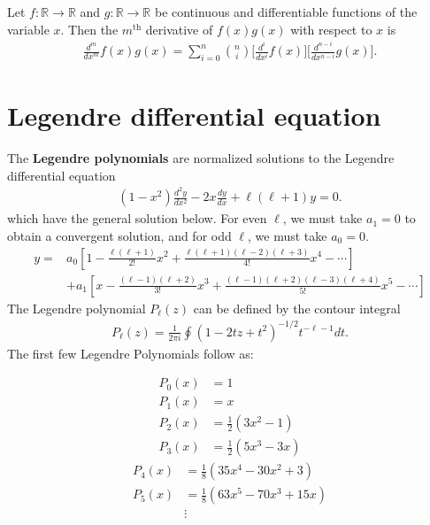 \newpage
\begin{fancybox}{}
	Let $f:\mathbb{R}\rightarrow\mathbb{R}$ and $g:\mathbb{R}\rightarrow\mathbb{R}$ be continuous and differentiable functions of the variable $x$. Then the $m^{\textrm{th}}$ derivative of $f(x)g(x)$ with respect to $x$ is
	\begin{align*}
	\frac{d^m}{dx^m}f(x)g(x)=\sum_{i=0}^{n}{{n}\choose{i}}\bigg[\frac{d^i}{dx^i}f(x) \bigg]\bigg[\frac{d^{n-i}}{dx^{n-i}}g(x) \bigg].
	\end{align*}
\end{fancybox}




\section{Legendre differential equation}
The \textbf{Legendre polynomials} are normalized solutions to the Legendre differential equation
\begin{align}
	(1-x^2)\frac{d^2y}{dx^2}-2x\frac{dy}{dx}+\ell(\ell+1)y=0.
\end{align}
which have the general solution below. For even $\ell$, we must take $a_1 = 0$ to obtain a convergent solution, and for odd $\ell$, we must take $a_0 = 0$.
\begin{align}
	y=&a_0\left[1-\frac{\ell(\ell+1)}{2!}x^2+\frac{\ell(\ell+1)(\ell-2)(\ell+3)}{4!}x^4-\cdots\right] \\&+a_1\left[x-\frac{(\ell-1)(\ell+2)}{3!}x^3+\frac{(\ell-1)(\ell+2)(\ell-3)(\ell+4)}{5!}x^5-\cdots\right]
\end{align}
The Legendre polynomial $P_\ell(z)$ can be defined by the contour integral
\begin{align}
	P_\ell(z) = \frac{1}{2\pi i}\oint (1-2tz+t^2)^{-1/2}t^{-\ell-1} dt.
\end{align}
The first few Legendre Polynomials follow as:
\begin{multicols}{2}
	\noindent
\begin{align}
	P_0(x) &=1 \\
	P_1(x) &= x \\
	P_2(x) &= \frac{1}{2}(3x^2-1) \\
	P_3(x) &= \frac{1}{2}(5x^3 -3x) 
\end{align}
\begin{align}
	P_4(x) &= \frac{1}{8}(35x^4 - 30x^2 +3) \\
	P_5(x) &= \frac{1}{8}(63x^5-70x^3+15x) \\
	&\vdots \nonumber
\end{align}
\end{multicols}
